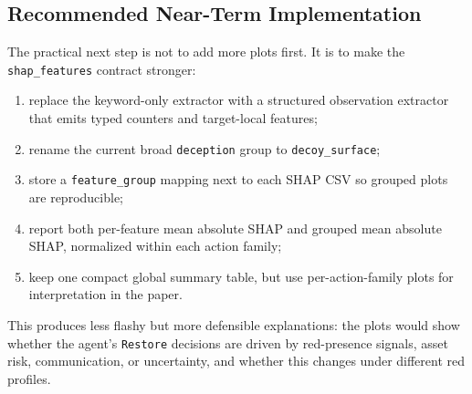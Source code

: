 \subsection{Recommended Near-Term Implementation}

The practical next step is not to add more plots first. It is to make the
\texttt{shap\_features} contract stronger:

\begin{enumerate}
  \item replace the keyword-only extractor with a structured observation
        extractor that emits typed counters and target-local features;
  \item rename the current broad \texttt{deception} group to
        \texttt{decoy\_surface};
  \item store a \texttt{feature\_group} mapping next to each SHAP CSV so grouped
        plots are reproducible;
  \item report both per-feature mean absolute SHAP and grouped mean absolute
        SHAP, normalized within each action family;
  \item keep one compact global summary table, but use per-action-family plots
        for interpretation in the paper.
\end{enumerate}

This produces less flashy but more defensible explanations: the plots would show
whether the agent's \texttt{Restore} decisions are driven by red-presence
signals, asset risk, communication, or uncertainty, and whether this changes
under different red profiles.
